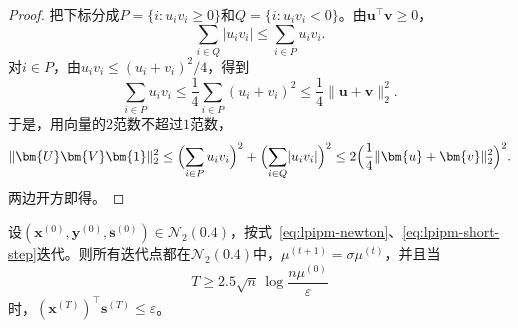 \begin{proof}
把下标分成$P=\{i:u_iv_i\geq0\}$和$Q=\{i:u_iv_i<0\}$。由$\bm{u}^\top\bm{v}\geq0$，
\[
 \sum_{i\in Q}\lvert u_iv_i\rvert\leq\sum_{i\in P}u_iv_i.
\]
对$i\in P$，由$u_iv_i\leq(u_i+v_i)^2/4$，得到
\[
 \sum_{i\in P}u_iv_i\leq\frac14\sum_{i\in P}(u_i+v_i)^2\leq\frac14\lVert\bm{u}+\bm{v}\rVert_2^2.
\]
于是，用向量的$2$范数不超过$1$范数，
\[
 \lVert\bm{U}\bm{V}\bm{1}\rVert_2^2
 \leq\Bigl(\sum_{i\in P}u_iv_i\Bigr)^2+\Bigl(\sum_{i\in Q}\lvert u_iv_i\rvert\Bigr)^2
 \leq2\Bigl(\frac14\lVert\bm{u}+\bm{v}\rVert_2^2\Bigr)^2.
\]
两边开方即得。
\end{proof}

\begin{theorem}[短步路径跟踪的迭代次数]
\label{thm:lpipm-short-step}
设$(\bm{x}^{(0)},\bm{y}^{(0)},\bm{s}^{(0)})\in\mathcal{N}_2(0.4)$，按式~\eqref{eq:lpipm-newton}、\eqref{eq:lpipm-short-step}迭代。则所有迭代点都在$\mathcal{N}_2(0.4)$中，$\mu^{(t+1)}=\sigma\mu^{(t)}$，并且当
\begin{equation}
 T\geq2.5\sqrt{n}\,\log\frac{n\mu^{(0)}}{\varepsilon}
 \label{eq:lpipm-iteration-bound}
\end{equation}
时，$(\bm{x}^{(T)})^\top\bm{s}^{(T)}\leq\varepsilon$。
\end{theorem}

